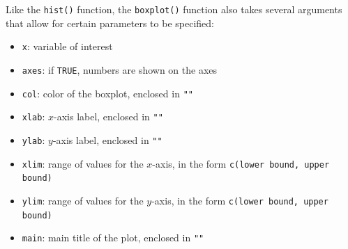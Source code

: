 \documentclass{article}\usepackage[]{graphicx}\usepackage[]{color}
\makeatletter
\def\maxwidth{ %
  \ifdim\Gin@nat@width>\linewidth
    \linewidth
  \else
    \Gin@nat@width
  \fi
}
\newcommand{\hlopt}[1]{\textcolor[rgb]{0,0,0}{#1}}%
\newcommand{\hlstd}[1]{\textcolor[rgb]{0.345,0.345,0.345}{#1}}%
\newcommand{\hlkwd}[1]{\textcolor[rgb]{0.737,0.353,0.396}{\textbf{#1}}}%
\newenvironment{kframe}{%
 \def\at@end@of@kframe{}%
 \ifinner\ifhmode%
  \def\at@end@of@kframe{\end{minipage}}%
  \begin{minipage}{\columnwidth}%
 \fi\fi%
 \def\FrameCommand##1{\hskip\@totalleftmargin \hskip-\fboxsep
 \colorbox{shadecolor}{##1}\hskip-\fboxsep
     \hskip-\linewidth \hskip-\@totalleftmargin \hskip\columnwidth}%
 \MakeFramed {\advance\hsize-\width
   \@totalleftmargin\z@ \linewidth\hsize
   \@setminipage}}%
 {\par\unskip\endMakeFramed%
 \at@end@of@kframe}
\newenvironment{knitrout}{}{} %
\makeatother
\begin{document}

Like the \texttt{hist()} function, the \texttt{boxplot()} function also takes several arguments that allow for certain parameters to be specified:
\begin{itemize}
\item \texttt{x}: variable of interest
\item \texttt{axes}: if \texttt{TRUE}, numbers are shown on the axes
\item \texttt{col}: color of the boxplot, enclosed in \texttt{""}
\item \texttt{xlab}: $x$-axis label, enclosed in \texttt{""}
\item \texttt{ylab}: $y$-axis label, enclosed in \texttt{""}
\item \texttt{xlim}: range of values for the $x$-axis, in the form \texttt{c(lower bound, upper bound)}
\item \texttt{ylim}: range of values for the $y$-axis, in the form \texttt{c(lower bound, upper bound)}
\item \texttt{main}: main title of the plot, enclosed in \texttt{""} 

\end{itemize}
\end{document}
